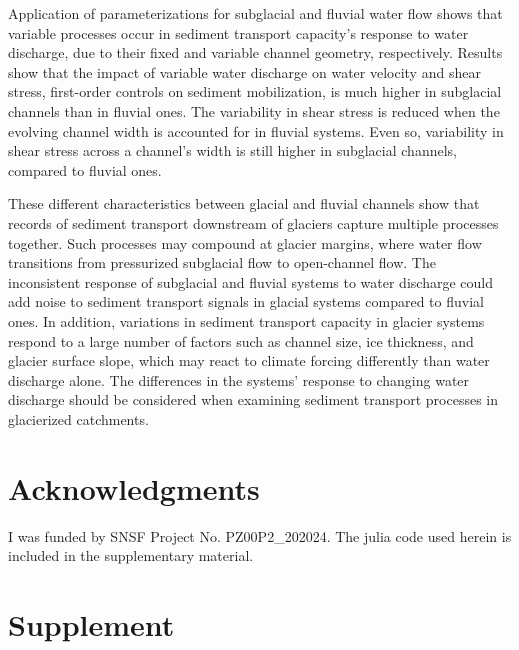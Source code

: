 \documentclass[11pt]{article}
\begin{document}
\begin{spacing}{1}
            Application of parameterizations for subglacial and fluvial water flow shows that variable processes occur in sediment transport capacity's response to water discharge, due to their fixed and variable channel geometry, respectively.
            Results show that the impact of variable water discharge on water velocity and shear stress, first-order controls on sediment mobilization, is much higher in subglacial channels than in fluvial ones.
              The variability in shear stress is reduced when the evolving channel width is accounted for in fluvial systems.
    Even so, variability in shear stress across a channel's width is still higher in subglacial channels, compared to fluvial ones.
              
    These different characteristics between glacial and fluvial channels show that records of sediment transport downstream of glaciers capture multiple processes together.
    Such processes may compound at glacier margins, where water flow transitions from pressurized subglacial flow to open-channel flow.
      The inconsistent response of subglacial and fluvial systems to water discharge could add  noise to sediment transport signals in glacial systems compared to fluvial ones.
        In addition, variations in sediment transport capacity in glacier systems respond to a large number of factors such as channel size, ice thickness, and glacier surface slope, which may react to climate forcing differently than water discharge alone. 
      The differences in the systems' response to changing water discharge should be considered when examining sediment transport processes in glacierized catchments.
          
          \section{Acknowledgments}
        
          I was funded by SNSF Project No. PZ00P2\_202024.
          The julia code used herein is included in the supplementary material.
        
          
        \end{spacing}
        
        
        
        
        
        \section{Supplement}
        
\end{document}
